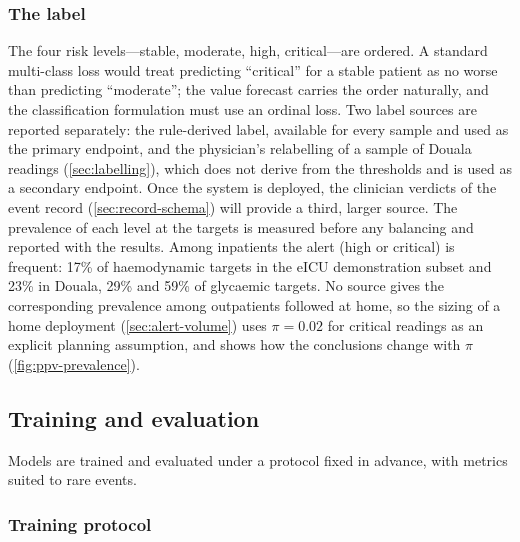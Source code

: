 \subsubsection{The label}\label{sec:label-design}\label{sec:two-labels}

The four risk levels---stable, moderate, high, critical---are ordered. A standard multi-class loss would treat predicting ``critical'' for a stable patient as no worse than predicting ``moderate''; the value forecast carries the order naturally, and the classification formulation must use an ordinal loss. Two label sources are reported separately: the rule-derived label, available for every sample and used as the primary endpoint, and the physician's relabelling of a sample of Douala readings (\cref{sec:labelling}), which does not derive from the thresholds and is used as a secondary endpoint. Once the system is deployed, the clinician verdicts of the event record (\cref{sec:record-schema}) will provide a third, larger source. The prevalence of each level at the targets is measured before any balancing and reported with the results. Among inpatients the alert (high or critical) is frequent: 17\% of haemodynamic targets in the eICU demonstration subset and 23\% in Douala, 29\% and 59\% of glycaemic targets. No source gives the corresponding prevalence among outpatients followed at home, so the sizing of a home deployment (\cref{sec:alert-volume}) uses $\pi = 0.02$ for critical readings as an explicit planning assumption, and shows how the conclusions change with $\pi$ (\cref{fig:ppv-prevalence}).

\subsection{Training and evaluation}\label{sec:evaluation}

Models are trained and evaluated under a protocol fixed in advance, with metrics suited to rare events.

\subsubsection{Training protocol}\label{sec:training}\label{sec:cv-structure}\label{sec:repeats}\label{sec:xgb-config}\label{sec:lstm-config}


